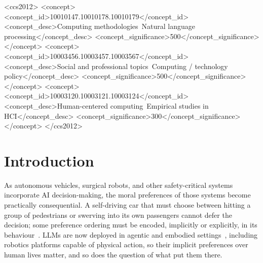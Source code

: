 \documentclass[manuscript,screen,review,anonymous]{acmart}
\begin{document}
\begin{CCSXML}
<ccs2012>
<concept>
<concept_id>10010147.10010178.10010179</concept_id>
<concept_desc>Computing methodologies~Natural language processing</concept_desc>
<concept_significance>500</concept_significance>
</concept>
<concept>
<concept_id>10003456.10003457.10003567</concept_id>
<concept_desc>Social and professional topics~Computing / technology policy</concept_desc>
<concept_significance>500</concept_significance>
</concept>
<concept>
<concept_id>10003120.10003121.10003124</concept_id>
<concept_desc>Human-centered computing~Empirical studies in HCI</concept_desc>
<concept_significance>300</concept_significance>
</concept>
</ccs2012>
\end{CCSXML}



\maketitle

\section{Introduction}

As autonomous vehicles, surgical robots, and other safety-critical systems
incorporate AI decision-making, the moral preferences of those systems become
practically consequential. A self-driving car that must choose between hitting a
group of pedestrians or swerving into its own passengers cannot defer the
decision; some preference ordering must be encoded, implicitly or explicitly, in
its behaviour~\cite{bonnefon2016}. LLMs are now deployed in agentic and embodied
settings~\cite{brohan2023,driess2023}, including robotics platforms capable of
physical action, so their implicit preferences over human lives matter, and so
does the question of what put them there.
\end{document}
